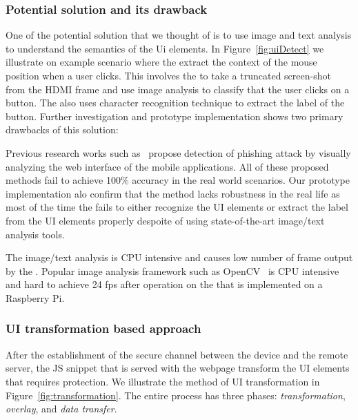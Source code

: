 \subsubsection{Potential solution and its drawback} One of the potential solution that we thought of is to use image and text analysis to understand the semantics of the Ui elements. In Figure~\ref{fig:uiDetect} we illustrate on example scenario where the \device extract the context of the mouse position when a user clicks. This involves the \device to take a truncated screen-shot from the HDMI frame and use image analysis to classify that the user clicks on a button. The \device also uses character recognition technique to extract the label of the button. Further investigation and prototype implementation shows two primary drawbacks of this solution:


\begin{mylist}
  \item Previous research works such as~\cite{lukaSpoof,Chen:2010:DVS:1754393.1754394} propose detection of phishing attack by visually analyzing the web interface of the mobile applications. All of these proposed methods fail to achieve 100\% accuracy in the real world scenarios. Our prototype implementation alo confirm that the method lacks robustness in the real life as most of the time the \device fails to either recognize the UI elements or extract the label from the UI elements properly despoite of using state-of-the-art image/text analysis tools.
  \item The image/text analysis is CPU intensive and causes low number of frame output by the \device. Popular image analysis framework such as OpenCV~\cite{opencv} is CPU intensive and hard to achieve 24 fps after operation on the \device that is implemented on a Raspberry Pi.
\end{mylist}


\subsubsection{UI transformation based approach} After the establishment of the secure channel between the device and the remote server, the \name JS snippet that is served with the webpage transform the UI elements that requires protection. We illustrate the method of UI transformation in Figure~\ref{fig:transformation}. The entire process has three phases: \emph{transformation}, \emph{overlay}, and \emph{data transfer}.

